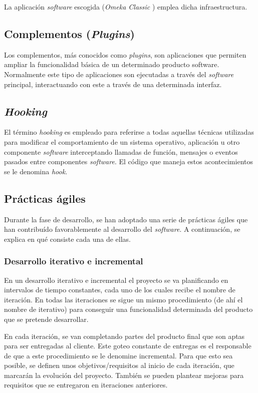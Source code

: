 La aplicación \emph{software} escogida (\emph{Omeka Classic} \cite{weboff:omeka}) emplea
dicha infraestructura.

\subsection{Complementos (\emph{Plugins})}

Los complementos, más conocidos como \emph{plugins}, son aplicaciones
que permiten ampliar la funcionalidad básica de un determinado producto
software. Normalmente este tipo de aplicaciones son ejecutadas a través
del \emph{software} principal, interactuando con este a través de una
determinada interfaz.

\subsection{\emph{Hooking}}

El término \emph{hooking} \cite{wiki:hook} es empleado para referirse a todas aquellas
técnicas utilizadas para modificar el comportamiento de un sistema
operativo, aplicación u otro componente \emph{software} interceptando
llamadas de función, mensajes o eventos pasados entre componentes
\emph{software}. El código que maneja estos acontecimientos se le
denomina \emph{hook}.


\subsection{Prácticas ágiles}

Durante la fase de desarrollo, se han adoptado una serie de prácticas ágiles que han
contribuído favorablemente al desarrollo del \emph{software}. A
continuación, se explica en qué consiste cada una de ellas.

\subsubsection{Desarrollo iterativo e incremental}

En un desarrollo iterativo e incremental el proyecto se va planificando
en intervalos de tiempo constantes, cada uno de los cuales recibe el
nombre de iteración. En todas las iteraciones se sigue un mismo
procedimiento (de ahí el nombre de iterativo) para conseguir una
funcionalidad determinada del producto que se pretende desarrollar.

En cada iteración, se van completando partes del producto final que son
aptas para ser entregadas al cliente. Este goteo constante de entregas
es el responsable de que a este procedimiento se le denomine
incremental. Para que esto sea posible, se definen unos
objetivos/requisitos al inicio de cada iteración, que marcarán la
evolución del proyecto. También se pueden plantear mejoras para
requisitos que se entregaron en iteraciones anteriores.

